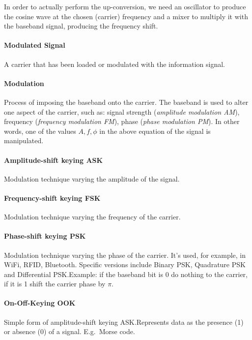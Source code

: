 In order to actually perform the up-conversion, we need an oscillator to
produce the cosine wave at the chosen (carrier) frequency and a mixer to
multiply it with the baseband signal, producing the frequency shift.

\paragraph{Modulated Signal}
A carrier that has been loaded or modulated with the information signal.

\paragraph{Modulation}
Process of imposing the baseband onto the carrier. The baseband is used to
alter one aspect of the carrier, such as: signal strength (\textit{amplitude
	modulation AM}), frequency (\textit{frequency modulation FM}), phase
(\textit{phase modulation PM}). In other words, one of the values $A, f, \phi$
in the above equation of the signal is manipulated.

\paragraph{Amplitude-shift keying ASK}
Modulation technique varying the amplitude of the signal.

\paragraph{Frequency-shift keying FSK}
Modulation technique varying the frequency of the carrier.

\paragraph{Phase-shift keying PSK}
Modulation technique varying the phase of the carrier. It's used, for example,
in WiFi, RFID, Bluetooth. Specific versions include Binary PSK, Quadrature PSK
and Differential PSK.\@ Example: if the baseband bit is 0 do nothing to the
carrier, if it is 1 shift the carrier phase by $\pi$.

\paragraph{On-Off-Keying OOK}
Simple form of amplitude-shift keying ASK.\@ Represents data as the presence
(1) or absence (0) of a signal. E.g.\ Morse code.


